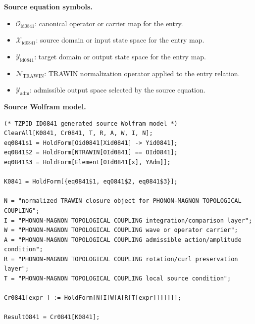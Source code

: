 \begin{minipage}[t]{0.49\linewidth}
\begingroup
\small
\raggedright
\textbf{Source equation symbols.}\par
\begin{itemize}[leftmargin=1.35em,itemsep=1pt,topsep=1pt,parsep=0pt]
    \item $\mathcal{O}_{\mathrm{id0841}}$: canonical operator or carrier map for the entry.
    \item $\mathcal{X}_{\mathrm{id0841}}$: source domain or input state space for the entry map.
    \item $\mathcal{Y}_{\mathrm{id0841}}$: target domain or output state space for the entry map.
    \item $\mathcal{N}_{\mathrm{TRAWIN}}$: TRAWIN normalization operator applied to the entry relation.
    \item $\mathcal{Y}_{\mathrm{adm}}$: admissible output space selected by the source equation.
\end{itemize}
\endgroup
\end{minipage}\hfill
\begin{minipage}[t]{0.47\linewidth}
\begingroup
\scriptsize
\raggedright
\textbf{Source Wolfram model.}\par
\begin{Verbatim}[fontsize=\tiny,breaklines=true,breakanywhere=true]
(* TZPID ID0841 generated source Wolfram model *)
ClearAll[K0841, Cr0841, T, R, A, W, I, N];
eq0841$1 = HoldForm[Oid0841[Xid0841] -> Yid0841];
eq0841$2 = HoldForm[NTRAWIN[OId0841] == OId0841];
eq0841$3 = HoldForm[Element[OId0841[x], YAdm]];

K0841 = HoldForm[{eq0841$1, eq0841$2, eq0841$3}];

N = "normalized TRAWIN closure object for PHONON-MAGNON TOPOLOGICAL COUPLING";
I = "PHONON-MAGNON TOPOLOGICAL COUPLING integration/comparison layer";
W = "PHONON-MAGNON TOPOLOGICAL COUPLING wave or operator carrier";
A = "PHONON-MAGNON TOPOLOGICAL COUPLING admissible action/amplitude condition";
R = "PHONON-MAGNON TOPOLOGICAL COUPLING rotation/curl preservation layer";
T = "PHONON-MAGNON TOPOLOGICAL COUPLING local source condition";

Cr0841[expr_] := HoldForm[N[I[W[A[R[T[expr]]]]]]];

Result0841 = Cr0841[K0841];
\end{Verbatim}
\endgroup
\end{minipage}

